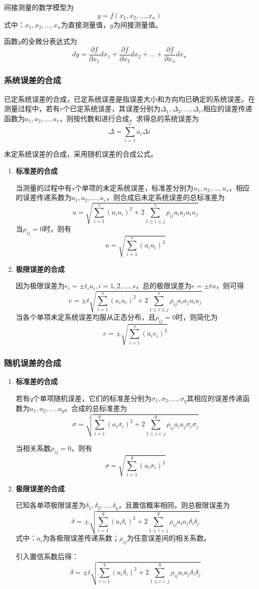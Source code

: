 间接测量的数学模型为\[ y=f(x_1,x_2,...,x_n) \]
式中：$ x_1,x_2,...,x_n $为直接测量值，$ y $为间接测量值。

函数$ y $的全微分表达式为\[ dy=\frac{\partial f}{\partial x_1}dx_1+\frac{\partial f}{\partial x_2}dx_2+...+\frac{\partial f}{\partial x_n}dx_n \]
\subsubsection{系统误差的合成}
已定系统误差的合成，已定系统误差是指误差大小和方向均已确定的系统误差。在测量过程中，若有$ r $个已定系统误差，其误差分别为$ \Delta_1,\Delta_2,...,\Delta_r $,相应的误差传递函数为$ a_1,a_2,...,a_r $，则按代数和进行合成，求得总的系统误差为\[ \Delta=\sum_{i=1}^{r}a_i\Delta i \]

未定系统误差的合成，采用随机误差的合成公式。
\begin{enumerate}
	\item \textbf{标准差的合成}
	
	\qquad 当测量的过程中有$ s $个单项的未定系统误差，标准差分别为$ u_1,u_2,...,u_s $，相应的误差传递系数为$ a_1,a_2,...,a_s $，则合成后未定系统误差的总标准差为\[ u=\sqrt{\sum_{i=1}^{s}(a_iu_i)^2+2\sum_{1\leq i\leq j}^{s}\rho_{ij}a_ia_ju_iu_j} \]
	当$ \rho_{ij}=0 $时，则有\[ u=\sqrt{\sum_{i=1}^{s}(a_iu_i)^2} \]
	\item \textbf{极限误差的合成}
	
	\qquad 因为极限误差为$ e_i=\pm t_iu_i,i=1,2,...,s $，总的极限误差为$ e=\pm tu $，则可得\[ e=\pm t\sqrt{\sum_{i=1}^{s}(a_iu_i)^2+2\sum_{1\leq i\leq j}^{s}\rho_{ij}a_ia_ju_iu_j} \]
	当各个单项未定系统误差均服从正态分布，且$ \rho_{ij}=0 $时，则简化为\[ e=\pm\sqrt{\sum_{i=1}^{s}(a_ie_i)^2} \]
\end{enumerate}
\subsubsection{随机误差的合成}
\begin{enumerate}
	\item \textbf{标准差的合成}
	
	\qquad 若有$ q $个单项随机误差，它们的标准差分别为$ \sigma_1,\sigma_2,...,\sigma_q $其相应的误差传递函数为$ a_1,a_2,...,a_q $。合成的总标准差为\[ \sigma=\sqrt{\sum_{i=1}^{q}(a_i\sigma_i)^2+2\sum_{1\leq i<j}^{q}\rho_{ij}a_ia_j\sigma_i\sigma_j} \]
	
	\qquad 当相关系数$ \rho_{ij}=0 $，则有\[ \sigma=\sqrt{\sum_{i=1}^{q}(a_i\sigma_i)^2} \]
	\item \textbf{极限误差的合成}
	
	\qquad  已知各单项极限误差为$ \delta_1,\delta_2,...,\delta_q $，且置信概率相同，则总极限误差为\[ \delta=\pm\sqrt{\sum_{i=1}^{q}(a_i\delta_i)^2+2\sum_{1\le i<j}^{q}\rho_{ij}a_ia_j\delta_i\delta_j} \]
	式中：$ a_i $为各极限误差传递系数；$ \rho_{ij} $为任意误差间的相关系数。
	
	\qquad 引入置信系数后得：\[ \delta=\pm t\sqrt{\sum_{i=1}^{q}(a_i\delta_i)^2+2\sum_{1\le i<j}^{q}\rho_{ij}a_ia_j\delta_i\delta_j} \]
\end{enumerate}

